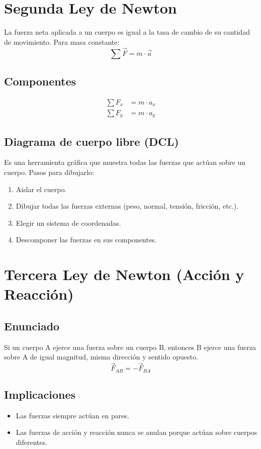 \section{Segunda Ley de Newton}

La fuerza neta aplicada a un cuerpo es igual a la tasa de cambio de su cantidad de movimiento. Para masa constante:
\begin{equation}
    \sum \vec{F} = m \cdot \vec{a}
\end{equation}

\subsection{Componentes}
\begin{align}
    \sum F_x &= m \cdot a_x \\
    \sum F_y &= m \cdot a_y
\end{align}

\subsection{Diagrama de cuerpo libre (DCL)}
Es una herramienta gráfica que muestra todas las fuerzas que actúan sobre un cuerpo. Pasos para dibujarlo:
\begin{enumerate}
    \item Aislar el cuerpo.
    \item Dibujar todas las fuerzas externas (peso, normal, tensión, fricción, etc.).
    \item Elegir un sistema de coordenadas.
    \item Descomponer las fuerzas en sus componentes.
\end{enumerate}

\section{Tercera Ley de Newton (Acción y Reacción)}

\subsection{Enunciado}
Si un cuerpo A ejerce una fuerza sobre un cuerpo B, entonces B ejerce una fuerza sobre A de igual magnitud, misma dirección y sentido opuesto.
\begin{equation}
    \vec{F}_{AB} = -\vec{F}_{BA}
\end{equation}

\subsection{Implicaciones}
\begin{itemize}
    \item Las fuerzas siempre actúan en pares.
    \item Las fuerzas de acción y reacción nunca se anulan porque actúan sobre cuerpos diferentes.
\end{itemize}

